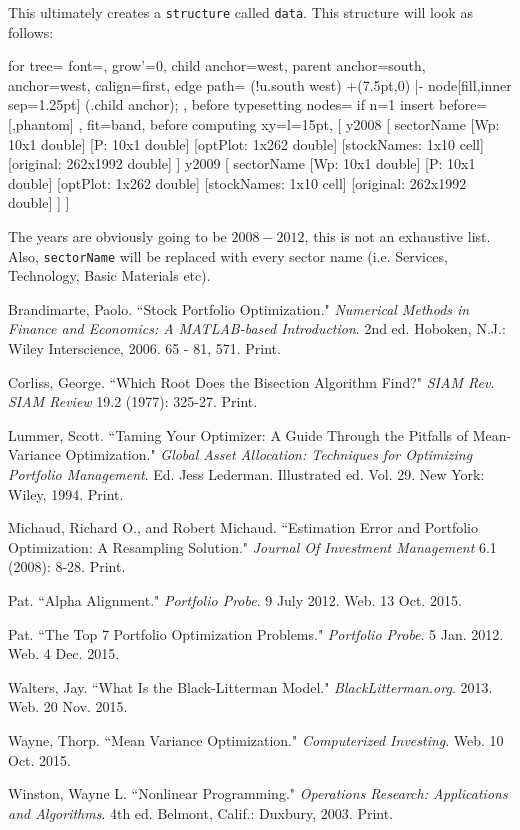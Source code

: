 \documentclass[12pt,titlepage,letter]{article}
\begin{document}
		\newpage
		This ultimately creates a \verb|structure| called \verb|data|. This structure will look as follows:
		\begin{center}
		\begin{forest}
			for tree={
			font=\ttfamily,
			grow'=0,
			child anchor=west,
			parent anchor=south,
			anchor=west,
			calign=first,
			edge path={
			\noexpand{}
			(!u.south west) +(7.5pt,0) |- node[fill,inner sep=1.25pt] {} (.child anchor);
			},
			before typesetting nodes={
			if n=1
			{insert before={[,phantom]}}
			{}
			},
			fit=band,
			before computing xy={l=15pt},
			}
			[
				y2008
					[
						sectorName
						[Wp: 10x1 double]
					    [P: 10x1 double]
					    [optPlot: 1x262 double]
					    [stockNames: 1x10 cell]
					    [original: 262x1992 double]
					]
				y2009
					[
						sectorName
						[Wp: 10x1 double]
					    [P: 10x1 double]
					    [optPlot: 1x262 double]
					    [stockNames: 1x10 cell]
					    [original: 262x1992 double]
					]
			]
		\end{forest}
		\end{center}
		The years are obviously going to be $2008-2012$, this is not an exhaustive list. Also, \verb|sectorName| will be replaced with every sector name (i.e. Services, Technology, Basic Materials etc).
\newpage

\begin{thebibliography}{10}
	 Brandimarte, Paolo. ``Stock Portfolio Optimization."  \emph{Numerical Methods in Finance and Economics: A MATLAB-based Introduction}. 2nd ed. Hoboken, N.J.: Wiley Interscience, 2006. 65 - 81, 571. Print.

	 Corliss, George. ``Which Root Does the Bisection Algorithm Find?" \emph{SIAM Rev. SIAM Review} 19.2 (1977): 325-27. Print.
	
	 Lummer, Scott. ``Taming Your Optimizer: A Guide Through the Pitfalls of Mean-Variance Optimization." \emph{Global Asset Allocation: Techniques for Optimizing Portfolio Management}. Ed. Jess Lederman. Illustrated ed. Vol. 29. New York: Wiley, 1994. Print.
	
	 Michaud, Richard O., and Robert Michaud. ``Estimation Error and Portfolio Optimization: A Resampling Solution." \emph{Journal Of Investment Management} 6.1 (2008): 8-28. Print.
	
	 Pat. ``Alpha Alignment." \emph{Portfolio Probe}. 9 July 2012. Web. 13 Oct. 2015.
	
	 Pat. ``The Top 7 Portfolio Optimization Problems."  \emph{Portfolio Probe}. 5 Jan. 2012. Web. 4 Dec. 2015.

	 Walters, Jay. ``What Is the Black-Litterman Model." \emph{BlackLitterman.org}. 2013. Web. 20 Nov. 2015.

	 Wayne, Thorp. ``Mean Variance Optimization."  \emph{Computerized Investing}. Web. 10 Oct. 2015.
	
	 Winston, Wayne L. ``Nonlinear Programming."  \emph{Operations Research: Applications and Algorithms}. 4th ed. Belmont, Calif.: Duxbury, 2003. Print.
\end{thebibliography}
\end{document}
